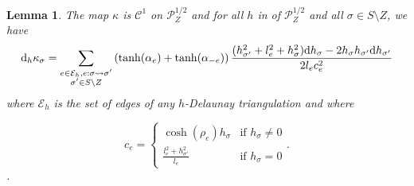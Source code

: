 \documentclass[a4paper,12pt]{article}
\def\adm{\P}
\def\d{\mathrm{d}}
\def\d{\mathrm{d}}
\def\adm{\mathcal{P}}
\def\P{\mathcal{P}}
\newtheorem{lem}{Lemma}[section]		 %
\theoremstyle{definition}
\begin{document}
        
			
				
					\begin{lem}\label{lem:dif_kappa}
					The map $\kappa$ is $\mathscr C^1$ on $\adm_Z^{1/2}$ and for all $h$ in of $\adm_Z^{1/2}$ and all $\sigma\in S\setminus Z$, we have
					$$\d_h \kappa_\sigma=\sum_{\substack{e\in \mathcal E_h, e:\sigma \rightsquigarrow \sigma' \\ \sigma'\in S\setminus Z} \\ } 
					\left(\tanh(\alpha_e)+\tanh(\alpha_{-e})\right)
					\frac{(h_{\sigma'}^2+l_e^2 + h_{\sigma}^2)\d h_{\sigma} - 2 h_{\sigma} h_{\sigma'} \d h_{\sigma'} }{2 l_e c_e^2}$$
					where $\mathcal E_h$ is the set of edges of any $h$-Delaunay triangulation and where 
					
					$$c_e = \left \{ \begin{array}{ll}
					                  \displaystyle\cosh(\rho_e) h_\sigma&\text{if }h_\sigma\neq 0\\
					                  \displaystyle\frac{l_e^2+h_{\sigma'}^2}{l_e}& \text{if } h_\sigma=0
					                 \end{array}\right. .
$$			
					.
					\end{lem}
\end{document}
